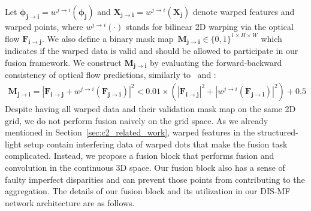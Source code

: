 Let $\boldsymbol{\phi_{j \rightarrow i}}=w^{j \rightarrow i}(\boldsymbol{\phi_j})$ and $\boldsymbol{X_{j \rightarrow i}}=w^{j \rightarrow i}(\boldsymbol{X_j})$ denote warped features and warped points, where $w^{j \rightarrow i}(\cdot)$ stands for bilinear 2D warping via the optical flow $\boldsymbol{F_{i \rightarrow j}}$. We also define a binary mask map~$\boldsymbol{M_{j \rightarrow i}} \in \{0,1\}^{1 \times H \times W}$ which indicates if the warped data is valid and should be allowed to participate in our fusion framework. We construct $\boldsymbol{M_{j \rightarrow i}}$ by evaluating the forward-backward consistency of optical flow predictions, similarly to~\cite{zou2018df} and \cite{meister2017unflow}:
\begin{align}\label{eqn:flow_forward_backward}
    \boldsymbol{M_{j \rightarrow i}} = |\boldsymbol{F_{i \rightarrow j}} + w^{j \rightarrow i}(\boldsymbol{F_{j \rightarrow i}})|^2 < 0.01 \times (|\boldsymbol{F_{i \rightarrow j}}|^2 + |w^{j \rightarrow i}(\boldsymbol{F_{j \rightarrow i}})|^2) + 0.5
\end{align}
Despite having all warped data and their validation mask map on the same 2D grid, we do not perform fusion naively on the grid space. As we already mentioned in Section~\ref{sec:c2_related_work}, warped features in the structured-light setup contain interfering data of warped dots that make the fusion task complicated. Instead, we propose a fusion block that performs fusion and convolution in the continuous 3D space. Our fusion block also has a sense of faulty imperfect disparities and can prevent those points from contributing to the aggregation. The details of our fusion block and its utilization in our DIS-MF network architecture are as follows.

